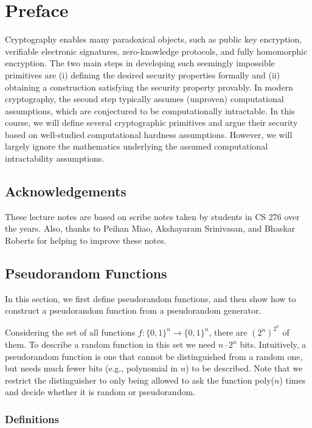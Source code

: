 \documentclass[12pt]{tufte-book}
\begin{document}
  \cleardoublepage
\fi
\chapter*{Preface}
Cryptography enables many paradoxical objects, such as public key encryption, verifiable electronic signatures, zero-knowledge protocols, and fully homomorphic encryption.  The two main steps in developing such seemingly impossible primitives are (i) defining the desired security properties formally and (ii) obtaining a construction satisfying the security property provably. In modern cryptography, the second step typically assumes (unproven) computational assumptions, which are conjectured to be computationally intractable. In this course, we will define several cryptographic primitives and argue their security based on well-studied computational hardness assumptions. However, we will largely ignore the mathematics underlying the assumed computational intractability assumptions.

\section*{Acknowledgements}
These lecture notes are based on scribe notes taken by students in CS 276 over the years. Also, thanks to Peihan Miao, Akshayaram Srinivasan, and Bhaskar Roberts for helping to improve these notes.
\newcommand{\sanjam}[1]{{\color{red} Sanjam: #1}}

\newcommand{\bhaskar}[1]{{\color{ForestGreen} Bhaskar: #1}}


\mainmatter
\section{Pseudorandom Functions}
In this section, we first define pseudorandom functions, and then show how to  construct a pseudorandom function from a pseudorandom generator.

Considering the set of all functions $f: \{0, 1\}^n \rightarrow \{0, 1\}^n$, there are $(2^n)^{2^n}$ of them.
To describe a random function in this set we need $n \cdot 2^n$ bits.
Intuitively, a pseudorandom function is one that cannot be distinguished from a random one,
but needs much fewer bits (e.g., polynomial in $n$) to be described.
Note that we restrict the distinguisher to only being allowed to ask the function poly($n$) times and decide whether it is random or pseudorandom.

\subsection{Definitions}
\end{document}

